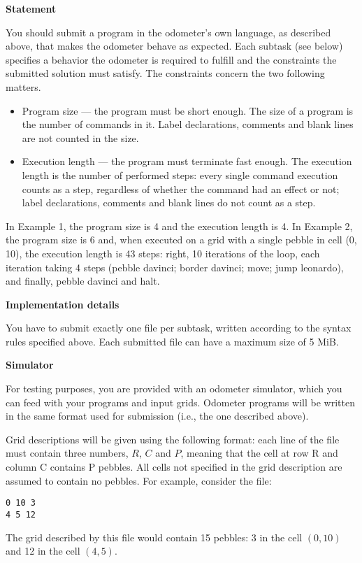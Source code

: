 {\bf Statement }

You should submit a program in the odometer's own language, as described above, that makes the odometer behave as expected. Each subtask (see below) specifies a behavior the odometer is required to fulfill and the constraints the submitted solution must satisfy. The constraints concern the two following matters.
\begin{itemize}
\item Program size --- the program must be short enough. The size of a program is the number of commands in it. Label declarations, comments and blank lines are not counted in the size.
\item Execution length --- the program must terminate fast enough. The execution length is the number of performed steps: every single command execution counts as a step, regardless of whether the command had an effect or not; label declarations, comments and blank lines do not count as a step. 
\end{itemize}

In Example 1, the program size is 4 and the execution length is 4. In Example 2, the program size is 6 and, when executed on a grid with a single pebble in cell (0, 10), the execution length is 43 steps: right, 10 iterations of the loop, each iteration taking 4 steps (pebble davinci; border davinci; move; jump leonardo), and finally, pebble davinci and halt.


{\bf Implementation details }

You have to submit exactly one file per subtask, written according to the syntax rules specified above. Each submitted file can have a maximum size of 5 MiB. 

{\bf Simulator}

For testing purposes, you are provided with an odometer simulator, which you can feed with your programs and input grids. Odometer programs will be written in the same format used for submission (i.e., the one described above).

Grid descriptions will be given using the following format: each line of the file must contain three numbers, $R$, $C$ and $P$, meaning that the cell at row R and column C contains P pebbles. All cells not specified in the grid description are assumed to contain no pebbles. For example, consider the file:
\begin{lstlisting}
0 10 3
4 5 12
\end{lstlisting}

The grid described by this file would contain 15 pebbles: 3 in the cell $(0, 10)$ and 12 in the cell $(4, 5)$.

